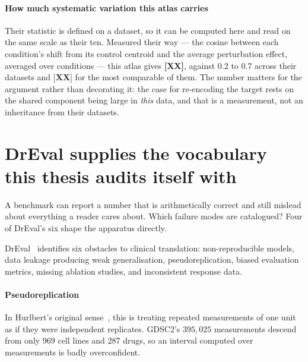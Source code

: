 \paragraph{How much systematic variation this atlas carries}
Their statistic is defined on a dataset, so it can be computed here and read on
the same scale as their ten. Measured their way --- the cosine between each
condition's shift from its control centroid and the average perturbation effect,
averaged over conditions --- this atlas gives \textbf{[XX]}, against $0.2$ to
$0.7$ across their datasets and $\textbf{[XX]}$ for the most comparable of them.
The number matters for the argument rather than decorating it: the case for
re-encoding the target rests on the shared component being large in \emph{this}
data, and that is a measurement, not an inheritance from their datasets.

\section{DrEval supplies the vocabulary this thesis audits itself with}
\label{sec:lit-dreval}
\framedecl{-}

\begin{question}
A benchmark can report a number that is arithmetically correct and still mislead
about everything a reader cares about. Which failure modes are catalogued? Four
of DrEval's six shape the apparatus directly.
\end{question}

\noindent
DrEval~\cite{dreval} identifies six obstacles to clinical translation:
non-reproducible models, data leakage producing weak generalisation,
pseudoreplication, biased evaluation metrics, missing ablation studies, and
inconsistent response data.

\paragraph{Pseudoreplication} In Hurlbert's original sense~\cite{hurlbert}, this
is treating repeated measurements of one unit as if they were independent
replicates. GDSC2's $395{,}025$ measurements descend from only $969$ cell lines
and $287$ drugs, so an interval computed over measurements is badly
overconfident.

